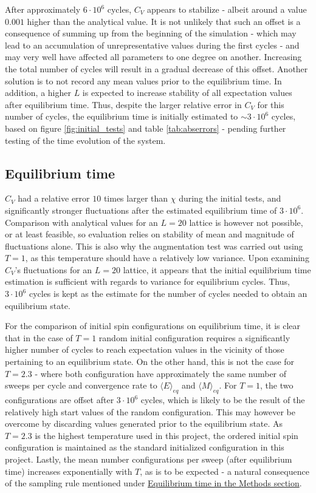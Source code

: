 \documentclass[%
oneside,                 %
final,                   %
10pt]{article}
\begin{document}
After approximately $6 \cdot 10^6$ cycles, $C_V$ appears to stabilize - albeit around a value $0.001$ higher than the analytical value. It is not unlikely that such an offset is a consequence of summing up from the beginning of the simulation - which may lead to an accumulation of unrepresentative values during the first cycles - and may very well have affected all parameters to one degree on another. Increasing the total number of cycles will result in a gradual decrease of this offset. Another solution is to not record any mean values prior to the equilibrium time. In addition, a higher $L$ is expected to increase stability of all expectation values after equilibrium time. Thus, despite the larger relative error in $C_V$ for this number of cycles, the equilibrium time is initially estimated to $\sim 3 \cdot 10^6$ cycles, based on  figure \ref{fig:initial_tests} and table \ref{tab:abserrors} - pending further testing of the time evolution of the system.

\subsection{Equilibrium time}
\label{SS:Disucssion_eqtime}
$C_V$ had a relative error $10$ times larger than $\chi$ during the initial tests, and significantly stronger fluctuations after the estimated equilibrium time of $3 \cdot 10^6$.  Comparison with analytical values for an $L=20$ lattice is however not possible, or at least feasible, so evaluation relies on stability of mean and magnitude of fluctuations alone. This is also why the augmentation test was carried out using $T=1$, as this temperature should have a relatively low variance. Upon examining $C_V$'s fluctuations for an $L=20$ lattice, it appears that the initial equilibrium time estimation is sufficient with regards to variance for equilibrium cycles.  Thus, $3 \cdot 10^6$ cycles is kept as the estimate for the number of cycles needed to obtain an equilibrium state. \newline

For the comparison of initial spin configurations on equilibrium time, it is clear that in the case of $T=1$ random initial configuration requires a significantly higher number of cycles to reach expectation values in the vicinity of those pertaining to an equilibrium state. On the other hand, this is not the case for $T=2.3$ - where both configuration have approximately the same number of sweeps per cycle and convergence rate to $\langle E \rangle_{eq}$ and $\langle M \rangle_{eq}$. For $T=1$, the two configurations are offset after $3\cdot 10^6$ cycles, which is likely to be the result of the relatively high start values of the random configuration. This may however be overcome by discarding values generated prior to the equilibrium state. As $T=2.3$ is the highest temperature used in this project, the ordered initial spin configuration is maintained as the standard initialized configuration in this project. Lastly, the mean number configurations per sweep (after equilibrium time) increases exponentially with $T$, as is to be expected - a natural consequence of the sampling rule mentioned under \hyperref[SS:M.Eq.time]{Equilibrium time in the Methods section}.
\end{document}

